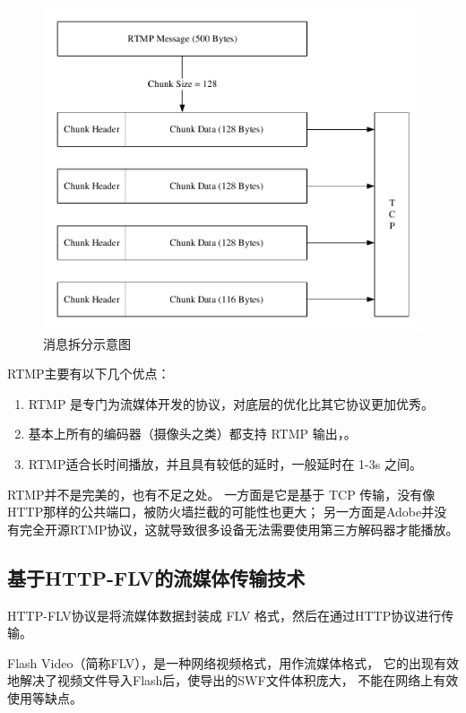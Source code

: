 \begin{figure}[ht]
    \centering
    \includegraphics[width=0.8\linewidth]{./Figure/IMG_rtmp.pdf}
    \caption{消息拆分示意图}
    \label{Fig:rtmp}
\end{figure}

\newpage
RTMP主要有以下几个优点：
\begin{enumerate}
    \item RTMP 是专门为流媒体开发的协议，对底层的优化比其它协议更加优秀。
    \item 基本上所有的编码器（摄像头之类）都支持 RTMP 输出，。
    \item RTMP适合长时间播放，并且具有较低的延时，一般延时在 1-3s 之间。
\end{enumerate}

RTMP并不是完美的，也有不足之处。
一方面是它是基于 TCP 传输，没有像HTTP那样的公共端口，被防火墙拦截的可能性也更大；
另一方面是Adobe并没有完全开源RTMP协议，这就导致很多设备无法需要使用第三方解码器才能播放。

\newpage
\subsection{基于HTTP-FLV的流媒体传输技术}
HTTP-FLV协议是将流媒体数据封装成 FLV 格式，然后在通过HTTP协议进行传输。

Flash Video（简称FLV），是一种网络视频格式，用作流媒体格式，
它的出现有效地解决了视频文件导入Flash后，使导出的SWF文件体积庞大，
不能在网络上有效使用等缺点\cite{WIKI_FLV}。

